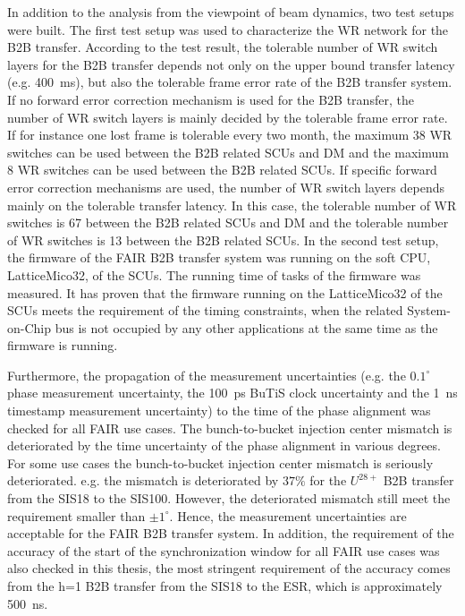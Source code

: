 In addition to the analysis from the viewpoint of beam dynamics, two test setups were built. The first test setup was used to characterize the WR network for the B2B transfer. According to the test result, the tolerable number of WR switch layers for the B2B transfer depends not only on the upper bound transfer latency (e.g. \SI{400}{\ms}), but also the tolerable frame error rate of the B2B transfer system. If no forward error correction mechanism is used for the B2B transfer, the number of WR switch layers is mainly decided by the tolerable frame error rate. If for instance one lost frame is tolerable every two month, the maximum 38 WR switches can be used between the B2B related SCUs and DM and the maximum 8 WR switches can be used between the B2B related SCUs. If specific forward error correction mechanisms are used, the number of WR switch layers depends mainly on the tolerable transfer latency. In this case, the tolerable number of WR switches is 67 between the B2B related SCUs and DM and the tolerable number of WR switches is 13 between the B2B related SCUs. In the second test setup, the firmware of the FAIR B2B transfer system was running on the soft CPU, LatticeMico32, of the SCUs. The running time of tasks of the firmware was measured. It has proven that the firmware running on the LatticeMico32 of the SCUs meets the requirement of the timing constraints, when the related System-on-Chip bus is not occupied by any other applications at the same time as the firmware is running.

Furthermore, the propagation of the measurement uncertainties (e.g. the $0.1^\circ$ phase measurement uncertainty, the \SI{100}{ps} BuTiS clock uncertainty and the \SI{1}{ns} timestamp measurement uncertainty) to the time of the phase alignment was checked for all FAIR use cases. The bunch-to-bucket injection center mismatch is deteriorated by the time uncertainty of the phase alignment in various degrees. For some use cases the bunch-to-bucket injection center mismatch is seriously deteriorated. e.g. the mismatch is deteriorated by $37\%$ for the $U^\mathit{28+}$ B2B transfer from the SIS18 to the SIS100. However, the deteriorated mismatch still meet the requirement smaller than $\pm1^\circ$. Hence, the measurement uncertainties are acceptable for the FAIR B2B transfer system. In addition, the requirement of the accuracy of the start of the synchronization window for all FAIR use cases was also checked in this thesis, the most stringent requirement of the accuracy comes from the h=1 B2B transfer from the SIS18 to the ESR, which is approximately \SI{500}{\ns}. 

